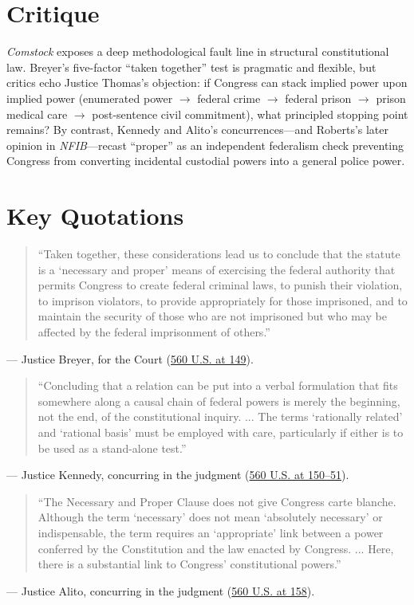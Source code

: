 \documentclass[12pt]{article}
\begin{document}
\section{Critique}
\textit{Comstock} exposes a deep methodological fault line in structural constitutional law. Breyer's five-factor ``taken together'' test is pragmatic and flexible, but critics echo Justice Thomas's objection: if Congress can stack implied power upon implied power (enumerated power $\rightarrow$ federal crime $\rightarrow$ federal prison $\rightarrow$ prison medical care $\rightarrow$ post-sentence civil commitment), what principled stopping point remains? By contrast, Kennedy and Alito's concurrences---and Roberts's later opinion in \textit{NFIB}---recast ``proper'' as an independent federalism check preventing Congress from converting incidental custodial powers into a general police power.

\section{Key Quotations}
\begin{quote}
``Taken together, these considerations lead us to conclude that the statute is a `necessary and proper' means of exercising the federal authority that permits Congress to create federal criminal laws, to punish their violation, to imprison violators, to provide appropriately for those imprisoned, and to maintain the security of those who are not imprisoned but who may be affected by the federal imprisonment of others.''
\end{quote}
\noindent --- Justice Breyer, for the Court (\href{https://www.law.cornell.edu/supct/html/08-1224.ZO.html}{560 U.S. at 149}).

\begin{quote}
``Concluding that a relation can be put into a verbal formulation that fits somewhere along a causal chain of federal powers is merely the beginning, not the end, of the constitutional inquiry. ... The terms `rationally related' and `rational basis' must be employed with care, particularly if either is to be used as a stand-alone test.''
\end{quote}
\noindent --- Justice Kennedy, concurring in the judgment (\href{https://www.law.cornell.edu/supct/html/08-1224.ZC.html}{560 U.S. at 150--51}).

\begin{quote}
``The Necessary and Proper Clause does not give Congress carte blanche. Although the term `necessary' does not mean `absolutely necessary' or indispensable, the term requires an `appropriate' link between a power conferred by the Constitution and the law enacted by Congress. ... Here, there is a substantial link to Congress' constitutional powers.''
\end{quote}
\noindent --- Justice Alito, concurring in the judgment (\href{https://www.law.cornell.edu/supct/html/08-1224.ZC1.html}{560 U.S. at 158}).
\end{document}
